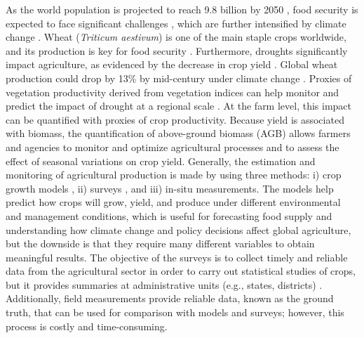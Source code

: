\documentclass[
  english,
  review,
  number,
  sort,compress,
  authoryear,
  3p]{elsarticle}
\begin{document}
As the world population is projected to reach 9.8 billion by 2050
\citep{UN2024}, food security is expected to face significant challenges
\citep{Bahar2020}, which are further intensified by climate change
\citep{Chen2025}. Wheat (\emph{Triticum aestivum}) is one of the main
staple crops worldwide, and its production is key for food security
\citep{FAO2025}. Furthermore, droughts significantly impact agriculture,
as evidenced by the decrease in crop yield
\citep{Santini2022, Naumann2021, Mishra2015}. Global wheat production
could drop by 13\% by mid-century under climate change
\citep{Pequeno2024}. Proxies of vegetation productivity derived from
vegetation indices can help monitor and predict the impact of drought at
a regional scale \citep{Zambrano2021, Zambrano2018, Zambrano2016}. At
the farm level, this impact can be quantified with proxies of crop
productivity. Because yield is associated with biomass, the
quantification of above-ground biomass (AGB) allows farmers and agencies
to monitor and optimize agricultural processes \citep{Dietz2021} and to
assess the effect of seasonal variations on crop yield. Generally, the
estimation and monitoring of agricultural production is made by using
three methods: i) crop growth models \citep{Lobell2010, Wang2023}, ii)
surveys \citep{Gardner1980}, and iii) in-situ measurements. The models
help predict how crops will grow, yield, and produce under different
environmental and management conditions, which is useful for forecasting
food supply and understanding how climate change and policy decisions
affect global agriculture, but the downside is that they require many
different variables to obtain meaningful results. The objective of the
surveys is to collect timely and reliable data from the agricultural
sector in order to carry out statistical studies of crops, but it
provides summaries at administrative units (e.g., states, districts)
\citep{Gardner1980}. Additionally, field measurements provide reliable
data, known as the ground truth, that can be used for comparison with
models and surveys; however, this process is costly and time-consuming.
\end{document}
